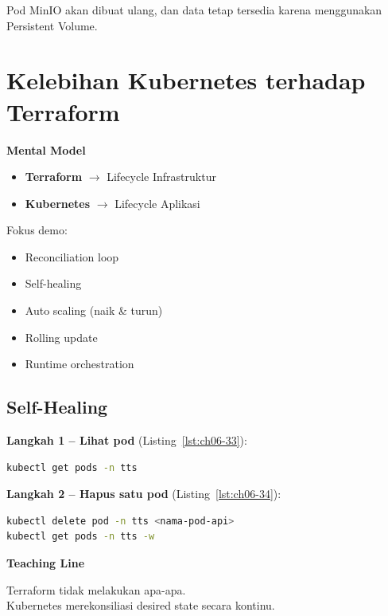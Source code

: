 Pod MinIO akan dibuat ulang, dan data tetap tersedia karena menggunakan Persistent Volume.



\section{Kelebihan Kubernetes terhadap Terraform}

\textbf{Mental Model}

\begin{itemize}
    \item \textbf{Terraform} $\rightarrow$ Lifecycle Infrastruktur
    \item \textbf{Kubernetes} $\rightarrow$ Lifecycle Aplikasi
\end{itemize}

Fokus demo:
\begin{itemize}
    \item Reconciliation loop
    \item Self-healing
    \item Auto scaling (naik \& turun)
    \item Rolling update
    \item Runtime orchestration
\end{itemize}

\subsection{Self-Healing}

\textbf{Langkah 1 -- Lihat pod} (Listing~\ref{lst:ch06-33}):

\begin{lstlisting}[language=bash, caption={Memeriksa objek Kubernetes (5)}, label={lst:ch06-33}]
kubectl get pods -n tts
\end{lstlisting}

\textbf{Langkah 2 -- Hapus satu pod} (Listing~\ref{lst:ch06-34}):

\begin{lstlisting}[language=bash, caption={Mengubah objek Kubernetes (3)}, label={lst:ch06-34}]
kubectl delete pod -n tts <nama-pod-api>
kubectl get pods -n tts -w
\end{lstlisting}

\textbf{Teaching Line}

Terraform tidak melakukan apa-apa. \\
Kubernetes merekonsiliasi desired state secara kontinu.

